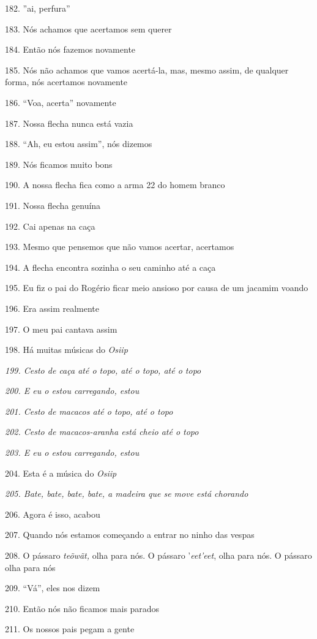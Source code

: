182. ''ai, perfura''

183. Nós achamos que acertamos sem querer

184. Então nós fazemos novamente

185. Nós não achamos que vamos acertá-la, mas, mesmo assim, de qualquer
forma, nós acertamos novamente

186. ``Voa, acerta'' novamente

187. Nossa flecha nunca está vazia

188. ``Ah, eu estou assim'', nós dizemos

189. Nós ficamos muito bons

190. A nossa flecha fica como a arma 22 do homem branco

191. Nossa flecha genuína

192. Cai apenas na caça

193. Mesmo que pensemos que não vamos acertar, acertamos

194. A flecha encontra sozinha o seu caminho até a caça

195. Eu fiz o pai do Rogério ficar meio ansioso por causa de um jacamim
voando

196. Era assim realmente

197. O meu pai cantava assim

198. Há muitas músicas do \emph{Osiip}

\emph{199. Cesto de caça até o topo, até o topo, até o topo}

\emph{200. E eu o estou carregando, estou }

\emph{201. Cesto de macacos até o topo, até o topo}

\emph{202. Cesto de macacos-aranha está cheio até o topo}

\emph{203. E eu o estou carregando, estou}

204. Esta é a música do \emph{Osiip}

\emph{205. Bate, bate, bate, bate, a madeira que se move está chorando}

206. Agora é isso, acabou

207. Quando nós estamos começando a entrar no ninho das vespas

208. O pássaro \emph{teõwãt,} olha para nós. O pássaro '\emph{eet'eet},
olha para nós. O pássaro olha para nós

209. ``Vá'', eles nos dizem

210. Então nós não ficamos mais parados

211. Os nossos pais pegam a gente

